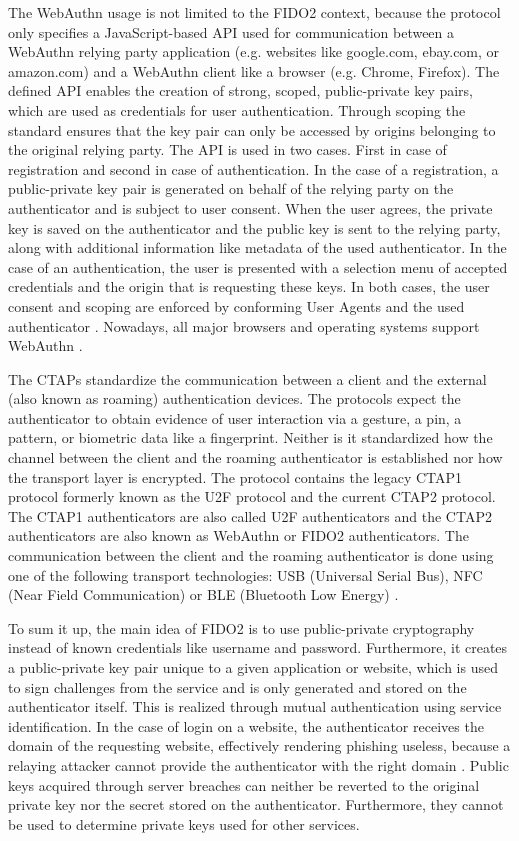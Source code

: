 \documentclass[runningheads]{llncs}
\begin{document}
The WebAuthn usage is not limited to the FIDO2 context, because the protocol only specifies a JavaScript-based API used for communication between a WebAuthn relying party application (e.g. websites like google.com, ebay.com, or amazon.com) and a WebAuthn client like a browser (e.g. Chrome, Firefox). The defined API enables the creation of strong, scoped, public-private key pairs, which are used as credentials for user authentication. Through scoping the standard ensures that the key pair can only be accessed by origins belonging to the original relying party. The API is used in two cases. First in case of registration and second in case of authentication. In the case of a registration, a public-private key pair is generated  on behalf of the relying party on the authenticator and is subject to user consent. When the user agrees, the private key is saved on the authenticator and the public key is sent to the relying party, along with additional information like metadata of the used authenticator. In the case of an authentication, the user is presented with a selection menu of accepted credentials and the origin that is requesting these keys. In both cases, the user consent and scoping are enforced by conforming User Agents and the used authenticator \cite{000002}. Nowadays, all major browsers and operating systems support WebAuthn \cite{000001}.

The CTAPs standardize the communication between a client and the external (also known as roaming) authentication devices. The protocols expect the authenticator to obtain evidence of user interaction via a gesture, a pin, a pattern, or biometric data like a fingerprint. Neither is it standardized how the channel between the client and the roaming authenticator is established nor how the transport layer is encrypted. The protocol contains the legacy CTAP1 protocol formerly known as the U2F protocol and the current CTAP2 protocol. The CTAP1 authenticators are also called U2F authenticators and the CTAP2 authenticators are also known as WebAuthn or FIDO2 authenticators. The communication between the client and the roaming authenticator is done using one of the following transport technologies: USB (Universal Serial Bus), NFC (Near Field Communication) or BLE (Bluetooth Low Energy) \cite{000003}\cite{274547}\cite{9099190}.

To sum it up, the main idea of FIDO2 is to use public-private cryptography instead of known credentials like username and password. Furthermore, it creates a public-private key pair unique to a given application or website, which is used to sign challenges from the service and is only generated and stored on the authenticator itself. This is realized through mutual authentication using service identification. In the case of login on a website, the authenticator receives the domain of the requesting website, effectively rendering phishing useless, because a relaying attacker cannot provide the authenticator with the right domain \cite{274610}. Public keys acquired through server breaches can neither be reverted to the original private key nor the secret stored on the authenticator. Furthermore, they cannot be used to determine private keys used for other services.
\end{document}

